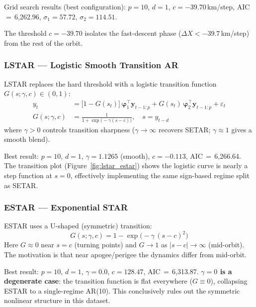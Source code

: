 \documentclass[conference]{IEEEtran}
\begin{document}
Grid search results (best configuration):
$p=10$, $d=1$, $c=-39.70$\,km/step,
AIC\,$=$\,6{,}262.96, $\sigma_1=57.72$, $\sigma_2=114.51$.

The threshold $c = -39.70$ isolates the fast-descent phase
($\Delta X < -39.7$\,km/step) from the rest of the orbit.

\subsubsection{LSTAR --- Logistic Smooth Transition AR}
LSTAR \cite{terasvirta1994} replaces the hard threshold with a logistic
transition function $G(s;\gamma,c) \in (0,1)$:
\begin{align}
y_t &= \bigl[1 - G(s_t)\bigr]\,\boldsymbol{\varphi}_1^\top \mathbf{y}_{t-1:p}
     + G(s_t)\,\boldsymbol{\varphi}_2^\top \mathbf{y}_{t-1:p} + \varepsilon_t
\label{eq:lstar_model} \\
G(s;\gamma,c) &= \frac{1}{1+\exp\bigl(-\gamma(s-c)\bigr)},
\quad s = y_{t-d}
\label{eq:lstar_transition}
\end{align}
where $\gamma > 0$ controls transition sharpness ($\gamma \to \infty$
recovers SETAR; $\gamma \approx 1$ gives a smooth blend).

Best result: $p=10$, $d=1$, $\gamma=1.1265$ (smooth), $c=-0.113$,
AIC\,$=$\,6{,}266.64. The transition plot (Figure~\ref{fig:lstar_estar})
shows the logistic curve is nearly a step function at $s=0$, effectively
implementing the same sign-based regime split as SETAR.

\subsubsection{ESTAR --- Exponential STAR}
ESTAR \cite{terasvirta1994} uses a U-shaped (symmetric) transition:
\begin{equation}
G(s;\gamma,c) = 1 - \exp\!\bigl(-\gamma\,(s-c)^2\bigr)
\label{eq:estar_transition}
\end{equation}
Here $G \approx 0$ near $s = c$ (turning points) and $G \to 1$ as
$|s - c| \to \infty$ (mid-orbit). The motivation is that near
apogee/perigee the dynamics differ from mid-orbit.

Best result: $p=10$, $d=1$, $\gamma = 0.0$, $c=128.47$, AIC\,$=$\,6{,}313.87.
\textbf{$\gamma = 0$ is a degenerate case}: the transition function is flat
everywhere ($G \equiv 0$), collapsing ESTAR to a single-regime AR(10). This
conclusively rules out the symmetric nonlinear structure in this dataset.
\end{document}

